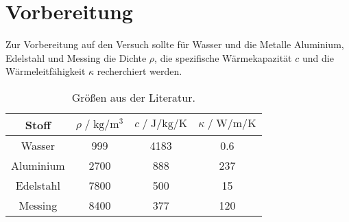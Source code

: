 \section{Vorbereitung}
\label{sec:vorbereitung}

Zur Vorbereitung auf den Versuch sollte für Wasser und die Metalle
Aluminium, Edelstahl und Messing die Dichte $\rho$,
die spezifische Wärmekapazität $c$ und die Wärmeleitfähigkeit $\kappa$ recherchiert werden.

\begin{table}
    \centering
    \caption{Größen aus der Literatur.}
    \label{tab:daten_vorbereitung}
    \begin{tabular}{c c c c}
     \toprule
     Stoff &
     $\rho \;/\; \si{\kilo\gram\per\cubic\meter}$ &
     $c \;/\; \si{\joule\per\kilo\gram\per\kelvin}$ &
     $\kappa \;/\; \si{\watt\per\meter\per\kelvin}$ \\
     \midrule
     Wasser    & 999  \cite{chemie_de_4} & 4183 \cite{chemie_de_4} & 0.6 \cite{chemie_de_2} \\
     Aluminium & 2700 \cite{chemie_de_1} & 888  \cite{chemie_de_1} & 237 \cite{chemie_de_1} \\
     Edelstahl & 7800 \cite{chemie_de_1} & 500  \cite{chemie_de_1} & 15  \cite{chemie_de_1} \\ %
     Messing   & 8400 \cite{chemie_de_3} & 377  \cite{chemie_de_3} & 120 \cite{chemie_de_2} \\
     \bottomrule
    \end{tabular}
\end{table}
